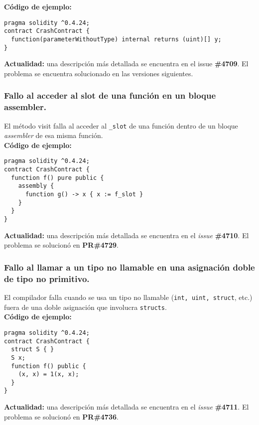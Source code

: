 \textbf{Código de ejemplo:}
\begin{lstlisting}[language=Solidity]
pragma solidity ^0.4.24;
contract CrashContract {
  function(parameterWithoutType) internal returns (uint)[] y;
}
\end{lstlisting}

\textbf{Actualidad:} una descripción más detallada se encuentra en el issue \textbf{\#4709}\cite{GHI4709}. El problema se encuentra solucionado en las versiones siguientes. \\

\subsubsection{Fallo al acceder al slot de una función en un bloque assembler.}

El método visit falla al acceder al \texttt{\_slot} de una función dentro de un bloque \textit{assembler} de esa misma función.\\

\textbf{Código de ejemplo:}
\begin{lstlisting}[language=Solidity]
pragma solidity ^0.4.24;
contract CrashContract {
  function f() pure public {
    assembly {
      function g() -> x { x := f_slot }
    }
  }
}
\end{lstlisting}

\textbf{Actualidad:} una descripción más detallada se encuentra en el \textit{issue} \textbf{\#4710}\cite{GHI4710}. El problema se solucionó en \textbf{PR\#4729}\cite{GHPR4729}.\\

\subsubsection{Fallo al llamar a un tipo no llamable en una asignación doble de tipo no primitivo.}

El compilador falla cuando se usa un tipo no llamable (\texttt{int, uint, struct}, etc.) fuera de una doble asignación que involucra \texttt{structs}.\\

\textbf{Código de ejemplo:}
\begin{lstlisting}[language=Solidity]
pragma solidity ^0.4.24;
contract CrashContract {
  struct S { }
  S x;
  function f() public {
    (x, x) = 1(x, x);
  }
}
\end{lstlisting}

\textbf{Actualidad:} una descripción más detallada se encuentra en el \textit{issue} \textbf{\#4711}\cite{GHI4711}. El problema se solucionó en \textbf{PR\#4736}\cite{GH4736}.\\

